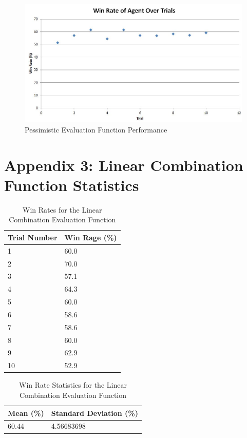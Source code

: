 \documentclass[12pt]{article}
\begin{document}
\begin{figure}[htbp]
\centering
\caption{Pessimistic Evaluation Function Performance}
\includegraphics[scale=0.71]{pessimistic-evaluation-function-results.JPG}
\end{figure}

\clearpage
\section{Appendix 3: Linear Combination Function Statistics}
\begin{table}[h]
\centering
\caption{Win Rates for the Linear Combination Evaluation Function}
\label{pessimistic-label}
\begin{tabular}{@{}|l|l|@{}}
\toprule
Trial Number & Win Rage (\%) \\ \midrule
1            & 60.0          \\ \midrule
2            & 70.0          \\ \midrule
3            & 57.1          \\ \midrule
4            & 64.3          \\ \midrule
5            & 60.0          \\ \midrule
6            & 58.6          \\ \midrule
7            & 58.6          \\ \midrule
8            & 60.0          \\ \midrule
9            & 62.9          \\ \midrule
10           & 52.9          \\ \bottomrule
\end{tabular}
\end{table}

\begin{table}[h]
\centering
\caption{Win Rate Statistics for the Linear Combination Evaluation Function}
\label{ratio-stats}
\begin{tabular}{@{}|l|l|@{}}
\toprule
Mean (\%)& Standard Deviation (\%) \\ \midrule
60.44           & 4.56683698
\\ \bottomrule
\end{tabular}
\end{table}
\end{document}
